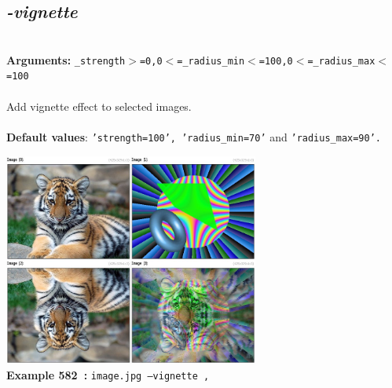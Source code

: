 \documentclass[a4paper,11pt,twoside]{book}
\begin{document}
\subsection{\emph{-vignette} }\vspace*{-0.5em}
~\\\textbf{Arguments: } 
{\small \texttt{\_strength$>$=0,0$<$=\_radius\_min$<$=100,0$<$=\_radius\_max$<$=100}}\\~\\
Add vignette effect to selected images.
~\\~\\\textbf{Default values}: {\small \texttt{'strength=100', 'radius\_min=70'} and \texttt{'radius\_max=90'.}}
\begin{center}\includegraphics[keepaspectratio=true,height=7cm,width=\textwidth]{img/gmic_def582.jpg}\\
{\footnotesize \textbf{Example 582~:} \texttt{image.jpg --vignette ,}}
\end{center}
\end{document}
